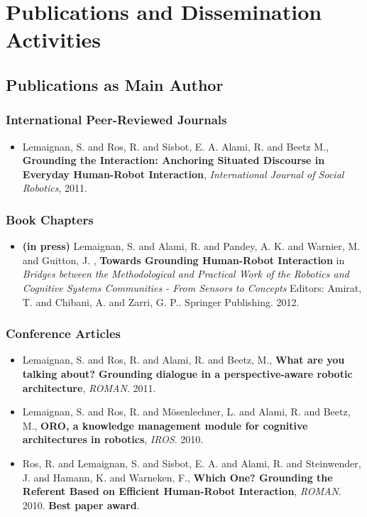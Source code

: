 \chapter{Publications and Dissemination Activities}
\label{chapt|publications}

\section{Publications as Main Author}

\subsection {International Peer-Reviewed Journals}

\begin{itemize}
    \item{Lemaignan, S. and Ros, R. and Sisbot, E. A. Alami, R. and Beetz M., \textbf{Grounding the Interaction: Anchoring Situated Discourse in Everyday Human-Robot Interaction}, \textit{International Journal of Social Robotics}, 2011.}
\end{itemize}

\subsection {Book Chapters}

\begin{itemize}
    \item{\textbf{(in press)} Lemaignan, S. and Alami, R. and Pandey, A. K. and Warnier, M. and Guitton, J. , \textbf{Towards Grounding Human-Robot Interaction} in \textit{Bridges between the Methodological and Practical Work of the Robotics and Cognitive Systems Communities - From Sensors to Concepts} Editors: Amirat, T. and Chibani, A. and Zarri, G. P.. Springer Publishing. 2012.}
\end{itemize}

\subsection {Conference Articles}

\begin{itemize}
    \item{Lemaignan, S. and Ros, R. and Alami, R. and Beetz, M., \textbf{What are you talking about? Grounding dialogue in a perspective-aware robotic architecture}, \textit{ROMAN}. 2011.}
    \item{Lemaignan, S. and Ros, R. and Mösenlechner, L. and Alami, R. and Beetz, M., \textbf{ORO, a knowledge management module for cognitive architectures in robotics}, \textit{IROS}. 2010.}
    \item{Ros, R. and Lemaignan, S. and Sisbot, E. A. and Alami, R. and Steinwender, J. and Hamann, K. and Warneken, F., \textbf{Which One? Grounding the Referent Based on Efficient Human-Robot Interaction}, \textit{ROMAN}. 2010. \textbf{Best paper award}.}
\end{itemize}


